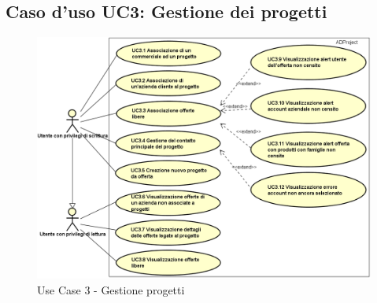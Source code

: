 	\hypertarget{UC3}{}
	\subsection{Caso d'uso UC3: Gestione dei progetti}
	\begin{figure}[H]
		\centering
		\includegraphics[scale=0.55]{images/useCase/UC3}
		\caption{Use Case 3 - Gestione progetti}
		\label{fig:uc3}
	\end{figure}
